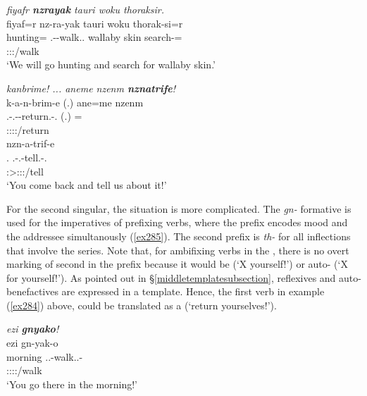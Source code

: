 \begin{exe}
	\ex \emph{fiyafr \textbf{nzrayak} tauri woku thoraksir.}\\
	\glll fiyaf=r nz-ra-yak tauri woku thorak-si=r\\
	hunting=\Purp{} \Fnsg.\Bet-\Irr-walk.\Ext.\Ndu{} wallaby skin search-\Nmlz=\Purp{}\\
	{} \footnotesize{\Fpl:\Sbj:\Irr:\Ipfv/walk} {} {} {}\\
	\trans `We will go hunting and search for wallaby skin.' 
	\label{ex283}
\end{exe}
\begin{exe}
	\ex \emph{kanbrime! ... aneme nzenm \textbf{nznatrife}!}\\
	\glll k-a-n-brim-e (.) ane=me nzenm\\
	\M.\Bet-\Vc.\Du-\Venit-return.\Rs-\Snsg.\Imp{} (.) \Dem=\Ins{}\\
	\footnotesize{\Sdu:\Sbj:\Imp:\Pfv:\Venit/return} {} {} {}\\
	\sn
	\glll nzn-a-trif-e\\
	\Fnsg.\Dat{} \Fnsg.\Bet-\Vc.\Du-tell.\Rs-\Snsg.\Imp{}\\
	\footnotesize{\Sdu:\Sbj>\Fdu:\Obj:\Imp:\Pfv/tell}\\
	\trans `You come back and tell us about it!' 
	\label{ex284}
\end{exe}

For the second singular, the situation is more complicated. The \emph{gn-} formative is used for the imperatives of prefixing verbs, where the prefix encodes  mood and the addressee simultanously (\ref{ex285}). The second  prefix is \emph{th-} for all inflections that involve the \Bet{} series. Note that, for ambifixing verbs in the , there is no overt marking of second  in the prefix because it would be  (`X yourself!') or auto- (`X for yourself!'). As pointed out in \S{}\ref{middletemplatesubsection}, reflexives and auto-benefactives are expressed in a  template. Hence, the first verb in example (\ref{ex284}) above, could be translated as a  (`return yourselves!').

\begin{exe}
	\ex \emph{ezi \textbf{gnyako}!}\\
	\glll ezi gn-yak-o\\
	morning \Ssg.\Bet.\Imp-walk.\Ext.\Ndu-\Andat\\
	{} \footnotesize{\Ssg:\Sbj:\Imp:\Ipfv:\Andat/walk}\\
	\trans `You go there in the morning!' 
	\label{ex285}
\end{exe}

